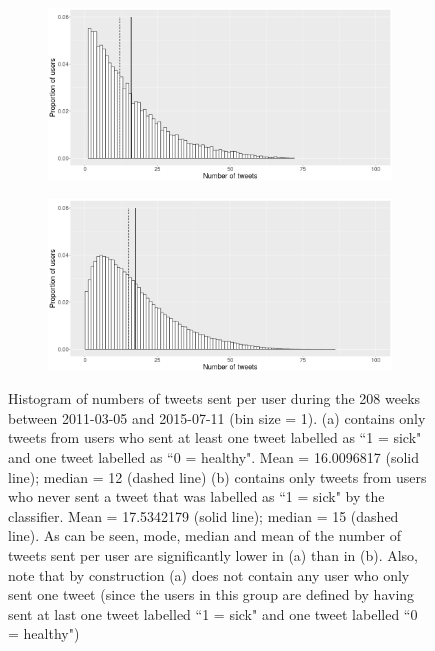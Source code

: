 \documentclass[11pt, a4paper,twoside]{report}\usepackage[]{graphicx}\usepackage[]{color}
\begin{document}
\begin{figure}[h]
\centering
  \begin{subfigure}[b]{1\textwidth}
  \includegraphics[width=1\linewidth]{user_activity_both_sick_raw_df.png}
  \caption{}
  \end{subfigure}
  \begin{subfigure}[b]{1\textwidth}
  \includegraphics[width=1\linewidth]{user_activity_only_healthy_sick_raw_df.png}
  \caption{}
  \end{subfigure}
  \caption{Histogram of numbers of tweets sent per user during the 208 weeks between 2011-03-05 and 2015-07-11 (bin size = 1). (a) contains only tweets from users who sent at least one tweet labelled as ``1 = sick" and one tweet labelled as ``0 = healthy".  Mean = 16.0096817 (solid line); median = 12 (dashed line) (b) contains only tweets from users who never sent a tweet that was labelled as ``1 = sick" by the classifier.  Mean = 17.5342179 (solid line); median = 15 (dashed line). As can be seen, mode, median and mean of the number of tweets sent per user are significantly lower in (a) than in (b). Also, note that by construction (a) does not contain any user who only sent one tweet (since the users in this group are defined by having sent at last one tweet labelled ``1 = sick" and one tweet labelled ``0 = healthy")}
  \label{fig:both_vs_healthy_only_hist}

\end{figure}
\end{document}
